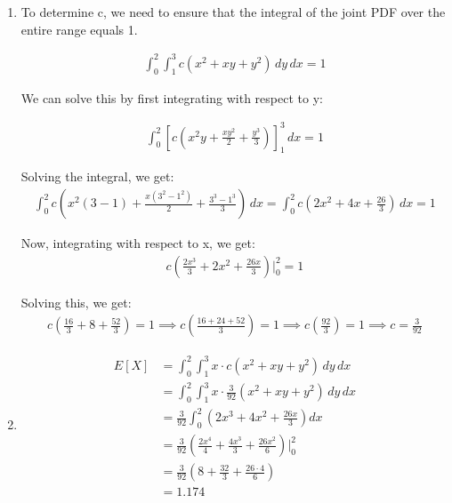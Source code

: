 \documentclass[a4paper]{article}
\begin{document}
\begin{enumerate}[label=(\alph*)]
    \item To determine c, we need to ensure that the integral of the joint PDF over the entire range equals 1.

    \begin{align*}
        \int_{0}^{2} \int_{1}^{3} c(x^2 + xy + y^2) \, dy \, dx = 1
    \end{align*}

    We can solve this by first integrating with respect to y:

    \begin{align*}
        \int_{0}^{2} \left[ c \left( x^2 y + \frac{xy^2}{2} + \frac{y^3}{3} \right) \right]_{1}^{3} \, dx = 1
    \end{align*}

    Solving the integral, we get:
    \begin{align*}
        \int_{0}^{2} c \left( x^2(3 - 1) + \frac{x(3^2 - 1^2)}{2} + \frac{3^3 - 1^3}{3} \right) \, dx = \int_{0}^{2} c \left( 2x^2 + 4x + \frac{26}{3} \right) \, dx = 1
    \end{align*}

    Now, integrating with respect to x, we get:
    \begin{align*}
        c \left( \frac{2x^3}{3} + 2x^2 + \frac{26x}{3} \right) \bigg|_{0}^{2} = 1
    \end{align*}

    Solving this, we get:
    \begin{align*}
        c \left( \frac{16}{3} + 8 + \frac{52}{3} \right) = 1 \implies c \left( \frac{16 + 24 + 52}{3} \right) = 1 \implies c \left( \frac{92}{3} \right) = 1 \implies c = \frac{3}{92}
    \end{align*}

    \vspace{5mm}
    \item \begin{align*}
        E[X] &= \int_{0}^{2} \int_{1}^{3} x \cdot c(x^2 + xy + y^2) \, dy \, dx \\
        &= \int_{0}^{2} \int_{1}^{3} x \cdot \frac{3}{92} (x^2 + xy + y^2) \, dy \, dx \\
        &=  \frac{3}{92} \int_{0}^{2} \left( 2x^3 + 4x^2 + \frac{26x}{3} \right) dx \\
        &=  \frac{3}{92} \left( \frac{2x^4}{4} + \frac{4x^3}{3} + \frac{26x^2}{6} \right) \bigg|_{0}^{2} \\
        &=  \frac{3}{92} \left( 8 + \frac{32}{3} + \frac{26 \cdot 4}{6} \right) \\
        &= 1.174
    \end{align*}


\end{enumerate}
\end{document}
